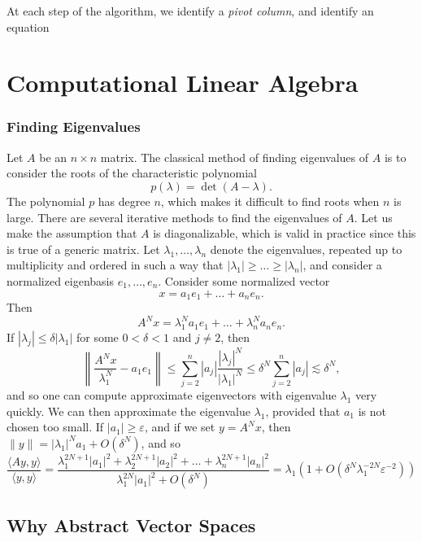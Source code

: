 At each step of the algorithm, we identify a \emph{pivot column}, and identify an equation





\part{Computational Linear Algebra}

\section{Finding Eigenvalues}

Let $A$ be an $n \times n$ matrix. The classical method of finding eigenvalues of $A$ is to consider the roots of the characteristic polynomial
%
\[ p(\lambda) = \det(A - \lambda). \]
%
The polynomial $p$ has degree $n$, which makes it difficult to find roots when $n$ is large. There are several iterative methods to find the eigenvalues of $A$. Let us make the assumption that $A$ is diagonalizable, which is valid in practice since this is true of a generic matrix. Let $\lambda_1, \dots, \lambda_n$ denote the eigenvalues, repeated up to multiplicity and ordered in such a way that $|\lambda_1| \geq \dots \geq |\lambda_n|$, and consider a normalized eigenbasis $e_1,\dots,e_n$. Consider some normalized vector
%
\[ x = a_1 e_1 + \dots + a_n e_n. \]
%
Then
%
\[ A^N x = \lambda_1^N a_1 e_1 + \dots + \lambda_n^N a_n e_n. \]
%
If $|\lambda_j| \leq \delta |\lambda_1|$ for some $0 < \delta < 1$ and $j \neq 2$, then
%
\[ \left\| \frac{A^N x}{\lambda_1^N} - a_1 e_1 \right\| \leq \sum_{j = 2}^n |a_j| \frac{|\lambda_j|^N}{|\lambda_1|^N} \leq \delta^N \sum_{j = 2}^n |a_j| \lesssim \delta^N, \]
%
and so one can compute approximate eigenvectors with eigenvalue $\lambda_1$ very quickly. We can then approximate the eigenvalue $\lambda_1$, provided that $a_1$ is not chosen too small. If $|a_1| \geq \varepsilon$, and if we set $y = A^N x$, then $\| y \| = |\lambda_1|^N a_1 + O(\delta^N)$, and so
%
\[ \frac{\langle Ay, y \rangle}{\langle y, y \rangle} = \frac{\lambda_1^{2N+1} |a_1|^2 + \lambda_2^{2N+1} |a_2|^2 + \dots + \lambda_n^{2N+1} |a_n|^2}{\lambda_1^{2N} |a_1|^2 + O(\delta^N)} = \lambda_1 \left( 1 + O( \delta^N \lambda_1^{-2N} \varepsilon^{-2} ) \right) \]





\chapter{Why Abstract Vector Spaces}

